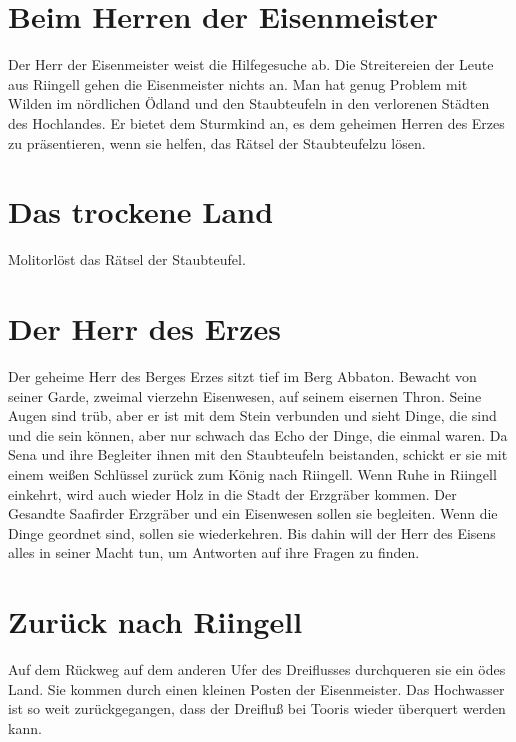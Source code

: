 \documentclass[12pt,a4paper,onecolumn,twoside,ngerman]{book}
\newcommand{\Molitor}{Molitor}
\newcommand{\Sena}{Sena}
\newcommand{\Sturmkind}{Sturmkind}
\newcommand{\Rhingell}{Riingell}
\newcommand{\Dreifluss}{Dreifluß}
\newcommand{\Toris}{Tooris}
\newcommand{\Eisenmeister}{Eisenmeister}
\newcommand{\Abaton}{Abbaton}
\newcommand{\Safir}{Saafir}
\newcommand{\Staubteufel}{Staubteufel}
\begin{document}
{\section{Beim Herren der {\Eisenmeister}}
Der Herr der {\Eisenmeister} weist die Hilfegesuche ab. Die Streitereien der Leute aus {\Rhingell}  gehen die {\Eisenmeister} nichts an. Man hat genug Problem mit Wilden im nördlichen Ödland und den {\Staubteufel}n in den verlorenen Städten des Hochlandes.\linebreak 
Er bietet dem {\Sturmkind} an, es dem geheimen Herren des Erzes zu präsentieren, wenn sie helfen, das Rätsel der \Staubteufel zu lösen.

\section{Das trockene Land}
{\Molitor}löst das Rätsel der {\Staubteufel}.

\section{Der Herr des Erzes}
Der geheime Herr des Berges Erzes sitzt tief im Berg {\Abaton}. Bewacht von seiner Garde, zweimal vierzehn Eisenwesen, auf seinem eisernen Thron. Seine Augen sind trüb, aber er ist mit dem Stein verbunden und sieht Dinge, die sind und die sein können, aber nur schwach das Echo der Dinge, die einmal waren.\linebreak
Da {\Sena} und ihre Begleiter ihnen mit den Staubteufeln beistanden, schickt er sie mit einem weißen Schlüssel zurück zum König nach {\Rhingell}. Wenn Ruhe in {\Rhingell} einkehrt, wird auch wieder Holz in die Stadt der Erzgräber kommen. Der Gesandte \Safir der Erzgräber und ein Eisenwesen sollen sie begleiten.\linebreak
Wenn die Dinge geordnet sind, sollen sie wiederkehren. Bis dahin will der Herr des Eisens alles in seiner Macht tun, um Antworten auf ihre Fragen zu finden.

\section{Zurück nach {\Rhingell}}
Auf dem Rückweg auf dem anderen Ufer des Dreiflusses durchqueren sie ein ödes Land. Sie kommen durch einen kleinen Posten der {\Eisenmeister}.\linebreak 
Das Hochwasser ist so weit zurückgegangen, dass der {\Dreifluss} bei {\Toris} wieder überquert werden kann.

}
\end{document}
